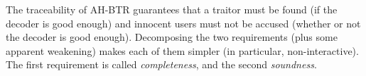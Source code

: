 The traceability of AH-BTR guarantees that a traitor must be found (if the decoder is good enough) and innocent users must not be accused (whether or not the decoder is good enough).
Decomposing the two requirements (plus some apparent weakening) makes each of them simpler (in particular, non-interactive).
The first requirement is called \emph{completeness}, and the second \emph{soundness}.
